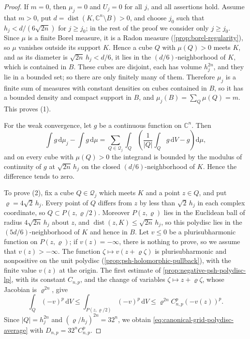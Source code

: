 \begin{proof}
If $m=0$, then $\mu_j=0$ and $U_j=0$ for all $j$, and all assertions hold. Assume that $m>0$, put $d=\operatorname{dist}(K,\mathbb C^n\setminus B)>0$, and choose $j_0$ such that $h_j<d/(6\sqrt{2n})$ for $j\geq j_0$; in the rest of the proof we consider only $j\geq j_0$. Since $\mu$ is a finite Borel measure, it is a Radon measure (\cref{prop:borel-regularity}), so $\mu$ vanishes outside its support $K$. Hence a cube $Q$ with $\mu(Q)>0$ meets $K$, and as its diameter is $\sqrt{2n}\,h_j<d/6$, it lies in the $(d/6)$-neighborhood of $K$, which is contained in $B$. These cubes are disjoint, each has volume $h_j^{2n}$, and they lie in a bounded set; so there are only finitely many of them. Therefore $\mu_j$ is a finite sum of measures with constant densities on cubes contained in $B$, so it has a bounded density and compact support in $B$, and $\mu_j(B)=\sum_Q\mu(Q)=m$. This proves (1).

For the weak convergence, let $g$ be a continuous function on $\mathbb C^n$. Then
\[
 \int g\,\mathrm d\mu_j-\int g\,\mathrm d\mu=\sum_{Q\in\mathcal Q_j}\int_Q\left(\frac1{|Q|}\int_Qg\,\mathrm dV-g\right)\mathrm d\mu,
\]
and on every cube with $\mu(Q)>0$ the integrand is bounded by the modulus of continuity of $g$ at $\sqrt{2n}\,h_j$ on the closed $(d/6)$-neighborhood of $K$. Hence the difference tends to zero.

To prove (2), fix a cube $Q\in\mathcal Q_j$ which meets $K$ and a point $z\in Q$, and put $\varrho=4\sqrt2\,h_j$. Every point of $Q$ differs from $z$ by less than $\sqrt2\,h_j$ in each complex coordinate, so $Q\subset P(z,\varrho/2)$. Moreover $P(z,\varrho)$ lies in the Euclidean ball of radius $4\sqrt{2n}\,h_j$ about $z$, and $\operatorname{dist}(z,K)\le\sqrt{2n}\,h_j$, so this polydisc lies in the $(5d/6)$-neighborhood of $K$ and hence in $B$. Let $v\le0$ be a plurisubharmonic function on $P(z,\varrho)$; if $v(z)=-\infty$, there is nothing to prove, so we assume that $v(z)>-\infty$. The function $\zeta\mapsto v(z+\varrho\zeta)$ is plurisubharmonic and nonpositive on the unit polydisc (\cref{prop:psh-holomorphic-pullback}), with the finite value $v(z)$ at the origin. The first estimate of \cref{prop:negative-psh-polydisc-lp}, with its constant $C_{n,p}$, and the change of variables $\zeta\mapsto z+\varrho\zeta$, whose Jacobian is $\varrho^{2n}$, give
\[
 \int_Q(-v)^p\,\mathrm dV\le\int_{P(z,\varrho/2)}(-v)^p\,\mathrm dV\le\varrho^{2n}C_{n,p}^p(-v(z))^p.
\]
Since $|Q|=h_j^{2n}$ and $(\varrho/h_j)^{2n}=32^n$, we obtain \eqref{eq:canonical-grid-polydisc-average} with $D_{n,p}=32^nC_{n,p}^p$.


\end{proof}
